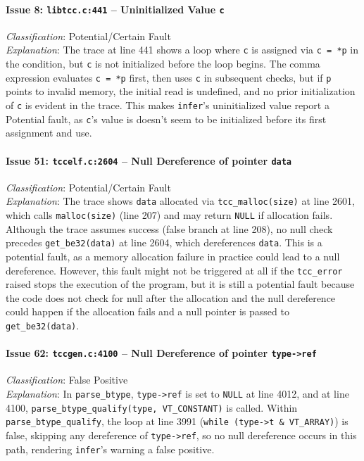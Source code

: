 \documentclass[conference]{IEEEtran}
\begin{document}
\paragraph{Issue 8: \texttt{libtcc.c:441} -- Uninitialized Value \texttt{c}}
\textit{Classification}: Potential/Certain Fault \\
\textit{Explanation}: The trace at line 441 shows a loop where \texttt{c} is assigned via \texttt{c = *p} in the condition, but \texttt{c} is not initialized before the loop begins. The comma expression evaluates \texttt{c = *p} first, then uses \texttt{c} in subsequent checks, but if \texttt{p} points to invalid memory, the initial read is undefined, and no prior initialization of \texttt{c} is evident in the trace. This makes \texttt{infer}’s uninitialized value report a Potential fault, as \texttt{c}’s value is doesn't seem to be initialized before its first assignment and use.

\paragraph{Issue 51: \texttt{tccelf.c:2604} -- Null Dereference of pointer \texttt{data}}
\textit{Classification}: Potential/Certain Fault \\
\textit{Explanation}: The trace shows \texttt{data} allocated via \texttt{tcc\_malloc(size)} at line 2601, which calls \texttt{malloc(size)} (line 207) and may return \texttt{NULL} if allocation fails. Although the trace assumes success (false branch at line 208), no null check precedes \texttt{get\_be32(data)} at line 2604, which dereferences \texttt{data}. This is a potential fault, as a memory allocation failure in practice could lead to a null dereference. However, this fault might not be triggered at all if the \texttt{tcc\_error} raised stops the execution of the program, but it is still a potential fault because the code does not check for null after the allocation and the null dereference could happen if the allocation fails and a null pointer is passed to \texttt{get\_be32(data)}.

\paragraph{Issue 62: \texttt{tccgen.c:4100} -- Null Dereference of pointer \texttt{type->ref}}
\textit{Classification}: False Positive \\
\textit{Explanation}: In \texttt{parse\_btype}, \texttt{type->ref} is set to \texttt{NULL} at line 4012, and at line 4100, \texttt{parse\_btype\_qualify(type, VT\_CONSTANT)} is called. Within \texttt{parse\_btype\_qualify}, the loop at line 3991 (\texttt{while (type->t \& VT\_ARRAY)}) is false, skipping any dereference of \texttt{type->ref}, so no null dereference occurs in this path, rendering \texttt{infer}’s warning a false positive.
\end{document}
